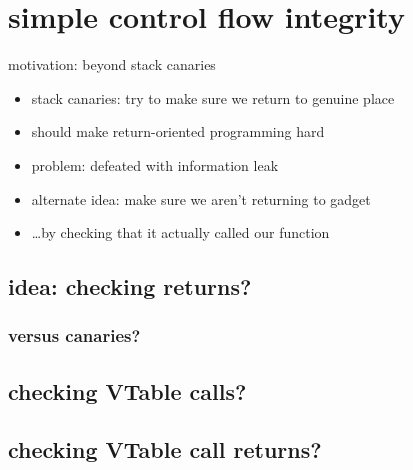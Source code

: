 
\section{simple control flow integrity}

\begin{frame}{motivation: beyond stack canaries}
    \begin{itemize}
    \item stack canaries: try to make sure we return to genuine place
    \item should make return-oriented programming hard
    \item problem: defeated with information leak
    \vspace{.5cm}
    \item alternate idea: make sure we aren't returning to gadget
    \item \ldots by checking that it actually called our function
    \end{itemize}
\end{frame}

\subsection{idea: checking returns?}



        

\subsubsection{versus canaries?}


\subsection{checking VTable calls?}


\subsection{checking VTable call returns?}


